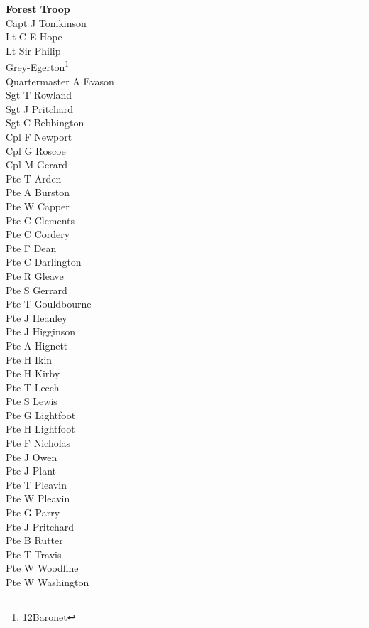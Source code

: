 \begin{multicols}{3}
  \small
  \noindent
  \textbf{Forest Troop} \\
  Capt J Tomkinson \\
  Lt C E Hope \\
  Lt Sir Philip \\ \indent Grey-Egerton\footnote{12\nth Baronet} \\
  Quartermaster A Evason \\
  Sgt T Rowland \\
  Sgt J Pritchard \\
  Sgt C Bebbington \\
  Cpl F Newport \\
  Cpl G Roscoe \\
  Cpl M Gerard \\
  Pte T Arden \\
  Pte A Burston \\
  Pte W Capper \\
  Pte C Clements \\
  Pte C Cordery \\
  Pte F Dean \\
  Pte C Darlington \\
  Pte R Gleave \\
  Pte S Gerrard \\
  Pte T Gouldbourne \\
  Pte J Heanley \\
  Pte J Higginson \\
  Pte A Hignett \\
  Pte H Ikin \\
  Pte H Kirby \\
  Pte T Leech \\
  Pte S Lewis \\
  Pte G Lightfoot \\
  Pte H Lightfoot \\
  Pte F Nicholas \\
  Pte J Owen \\
  Pte J Plant \\
  Pte T Pleavin \\
  Pte W Pleavin \\
  Pte G Parry \\
  Pte J Pritchard \\
  Pte B Rutter \\
  Pte T Travis \\
  Pte W Woodfine \\
  Pte W Washington \\

\end{multicols}
